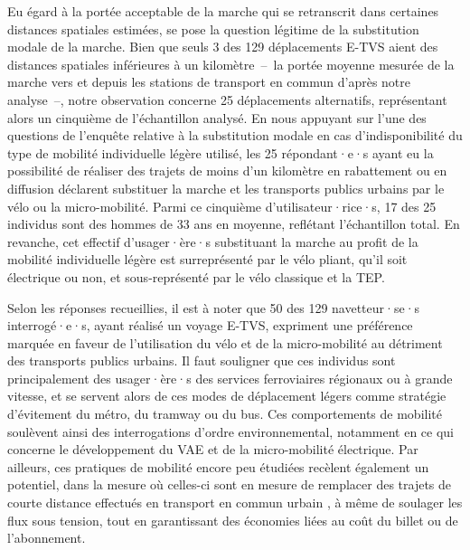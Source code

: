 \begin{refsegment}
Eu égard à la portée acceptable de la marche qui se retranscrit dans certaines distances spatiales estimées, se pose la question légitime de la substitution modale de la marche. Bien que seuls 3 des 129 déplacements \acrshort{E-TVS} aient des distances spatiales inférieures à un kilomètre~–~la portée moyenne mesurée de la marche vers et depuis les stations de transport en commun d'après notre analyse~–, notre observation concerne 25 déplacements alternatifs, représentant alors un cinquième de l'échantillon analysé. En nous appuyant sur l'une des questions de l'enquête relative à la substitution modale en cas d'indisponibilité du type de mobilité individuelle légère utilisé, les 25 répondant·e·s ayant eu la possibilité de réaliser des trajets de moins d'un kilomètre en rabattement ou en diffusion déclarent substituer la marche et les transports publics urbains par le vélo ou la micro-mobilité. Parmi ce cinquième d'utilisateur·rice·s, 17 des 25 individus sont des hommes de 33 ans en moyenne, reflétant l'échantillon total. En revanche, cet effectif d'usager·ère·s substituant la marche au profit de la mobilité individuelle légère est surreprésenté par le vélo pliant, qu'il soit électrique ou non, et sous-représenté par le vélo classique et la \acrshort{TEP}.%

Selon les réponses recueillies, il est à noter que 50 des 129 navetteur·se·s interrogé·e·s, ayant réalisé un voyage \acrshort{E-TVS}, expriment une préférence marquée en faveur de l'utilisation du vélo et de la micro-mobilité au détriment des transports publics urbains. Il faut souligner que ces individus sont principalement des usager·ère·s des services ferroviaires régionaux ou à grande vitesse, et se servent alors de ces modes de déplacement légers comme stratégie d'évitement du métro, du tramway ou du bus. Ces comportements de mobilité soulèvent ainsi des interrogations d'ordre environnemental, notamment en ce qui concerne le développement du \acrfull{VAE} et de la micro-mobilité électrique. Par ailleurs, ces pratiques de mobilité encore peu étudiées recèlent également un potentiel, dans la mesure où celles-ci sont en mesure de remplacer des trajets de courte distance effectués en transport en commun urbain \textcolor{blue}{\autocite[328]{sun_can_2017}}, à même de soulager les flux sous tension, tout en garantissant des économies liées au coût du billet ou de l'abonnement.%


\end{refsegment}

